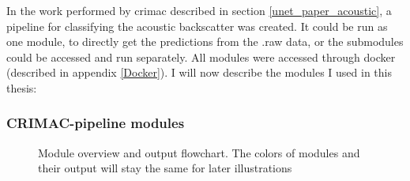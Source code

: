             In the work performed by \gls{crimac} described in section \ref{unet_paper_acoustic}, a pipeline for classifying the acoustic backscatter was created. It could be run as one module, to directly get the predictions from the .raw data, or the submodules could be accessed and run separately. All modules were accessed through docker (described in appendix \ref{Docker}). I will now describe the modules I used in this thesis:
            
            
            \subsubsection{CRIMAC-pipeline modules} \label{CRIMAC-pipeline}
              \begin{figure}[H]
                \centering
                
                \caption[Module overview]{Module overview and output flowchart. The colors of modules and  their output will stay the same for later illustrations}
              	\medskip 
                \label{Module_overview_fig}
            \end{figure}

